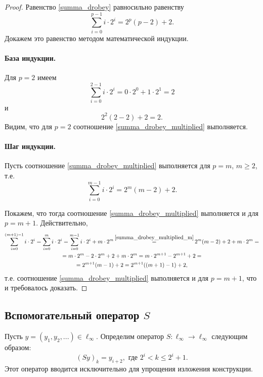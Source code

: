 \begin{proof}
	Равенство \eqref{summa_drobey} равносильно равенству
	\begin{equation}\label{summa_drobey_multiplied}
		\sum_{i=0}^{p-1} i \cdot 2^i = 2^p(p-2) + 2
		.
	\end{equation}
	Докажем это равенство методом математической индукции.

	\paragraph{База индукции.}
	Для $p=2$ имеем
	\begin{equation}
		\sum_{i=0}^{2-1} i \cdot 2^i = 0 \cdot 2^0 + 1 \cdot 2^1 = 2
	\end{equation}
	и
	\begin{equation}
		2^2(2-2) + 2 = 2
		.
	\end{equation}
	Видим, что для $p=2$ соотношение \eqref{summa_drobey_multiplied} выполняется.

	\paragraph{Шаг индукции.}
	Пусть соотношение \eqref{summa_drobey_multiplied} выполняется для $p=m$, $m\geq 2$, т.е.
	\begin{equation}\label{summa_drobey_multiplied_m}
		\sum_{i=0}^{m-1} i \cdot 2^i = 2^m(m-2) + 2
		.
	\end{equation}

	Покажем, что тогда соотношение \eqref{summa_drobey_multiplied} выполняется и для $p=m+1$.
	Действительно,
	\begin{multline}
		\sum_{i=0}^{(m+1)-1} i \cdot 2^i
		=
		\sum_{i=0}^{m} i \cdot 2^i
		=
		\sum_{i=0}^{m - 1} i \cdot 2^i + m\cdot 2 ^m
		\mathop{=}^{\eqref{summa_drobey_multiplied_m}}
		2^m(m-2) + 2 + m\cdot 2 ^m
		=
		\\=
		m\cdot2^m-2\cdot2^m  + 2 + m\cdot 2 ^m
		=
		m\cdot2^{m+1}-2^{m+1}  + 2
		=
		\\=
		2^{m+1}(m-1)  + 2
		=
		2^{m+1}((m+1)-1)  + 2
		,
	\end{multline}
	т.е. соотношение \eqref{summa_drobey_multiplied} выполняется и для $p=m+1$,
	что и требовалось доказать.
\end{proof}


\subsection{Вспомогательный оператор $S$}
Пусть $y=(y_1,y_2,...)\in \ell_\infty$.
Определим оператор $S:\ell_\infty \to \ell_\infty$ следующим образом:
\begin{equation}\label{operator_S}
	(Sy)_k = y_{i+2}, \mbox{ где } 2^i < k \leq 2^i+1
	.
\end{equation}
Этот оператор вводится исключительно для упрощения изложения конструкции.

